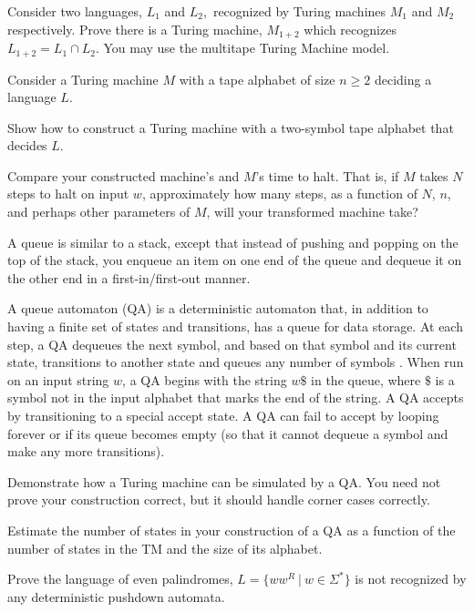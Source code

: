 \documentclass[letterpaper, ps]{cs121}
\begin{document}

Consider two languages, $L_1$ and $L_2,$ recognized by Turing machines $M_1$ and $M_2$ respectively. Prove there is a Turing machine, $M_{1 + 2}$ which recognizes $L_{1 + 2} = L_1 \cap L_2.$  You may use the multitape Turing Machine model.


Consider a Turing machine $M$ with a tape alphabet of size $n \geq 2$ deciding a language $L$. 

\subproblem Show how to construct a Turing machine with a two-symbol tape alphabet that decides $L$.

\subproblem Compare your constructed machine's and $M$'s time to halt. That is, if $M$ takes $N$ steps to halt on input $w$, approximately how many steps, as a function of $N$, $n$, and perhaps other parameters of $M$, will your transformed machine take?

A queue is similar to a stack, except that instead of pushing and popping on the top of the stack, you enqueue an item on one end of the queue and dequeue it on the other end in a first-in/first-out manner.

A queue automaton (QA) is a deterministic automaton that, in addition to having a finite set of states and transitions, has a queue for data storage. At each step, a QA dequeues the next symbol, and based on that symbol and its current state, transitions to another state and queues any number of symbols . When run on an input string $w$, a QA begins with the string $w\$$ in the queue, where $\$$ is a symbol not in the input alphabet that marks the end of the string. A QA accepts by transitioning to a special accept state. A QA can fail to accept by looping forever or if its queue becomes empty (so that it cannot dequeue a symbol and make any more transitions).

\subproblem
Demonstrate how a Turing machine can be simulated by a QA. You need not prove your construction correct, but it should handle corner cases correctly.

\subproblem
Estimate the number of states in your construction of a QA as a function of the number of states in the TM and the size of its alphabet.


Prove the language of even palindromes, $L = \{ww^R~|~w\in \Sigma^*\}$ is not recognized by any deterministic pushdown automata. 
\end{document}
